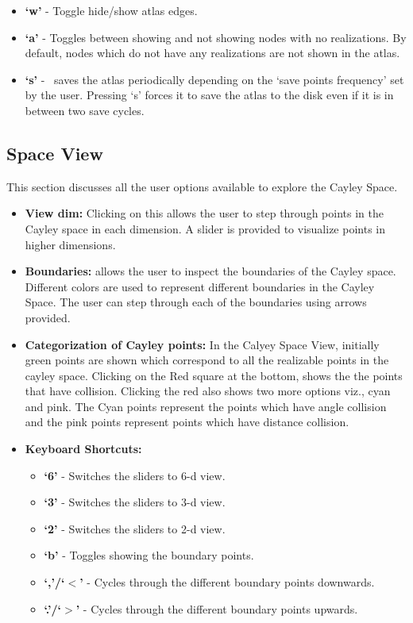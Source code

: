 \documentclass[10pt]{article}
\begin{document}
\begin{itemize}
\begin{itemize}
				\item \textbf{`w'} - Toggle hide/show atlas edges.
				\item \textbf{`a'} - Toggles between showing and not showing
						nodes with no realizations. By default, nodes which do
						not have any realizations are not shown in the atlas.
				\item \textbf{`s'} - \EASAL~saves the atlas periodically
						depending on the `save points frequency' set by the
						user. Pressing `s' forces it to save the atlas to the
						disk even if it is in between two save cycles.
		\end{itemize}
\end{itemize}



\subsection{Space View}
This section discusses all the user options available to explore the Cayley Space.
\begin{itemize}
		\item \textbf{View dim:} Clicking on this allows the user to step
				through points in the Cayley space in each dimension. A slider
				is provided to visualize points in higher dimensions.  \item
				\textbf{Boundaries:} allows the user to inspect the boundaries
				of the Cayley space.  Different colors are used to represent
				different boundaries in the Cayley Space. The user can step
				through each of the boundaries using arrows provided.
		\item \textbf{Categorization of Cayley points:} In the Calyey Space
				View, initially green points are shown which correspond to all
				the realizable points in the cayley space. Clicking on the Red
				square at the bottom, shows the the points that have collision.
				Clicking the red also shows two more options viz., cyan and
				pink. The Cyan points represent the points which have angle
				collision and the pink points represent points which have
				distance collision.
		\item \textbf{Keyboard Shortcuts:}
				\begin{itemize}
						\item \textbf{`6'} - Switches the sliders to 6-d view.
						\item \textbf{`3'} - Switches the sliders to 3-d view.
						\item \textbf{`2'} - Switches the sliders to 2-d view.
						\item \textbf{`b'} - Toggles showing the boundary points.
						\item \textbf{`,'/`$<$'} - Cycles through the different
								boundary points downwards.
						\item \textbf{`.'/`$>$'} - Cycles through the different
								boundary points upwards.
				\end{itemize}
\end{itemize}
\end{document}
